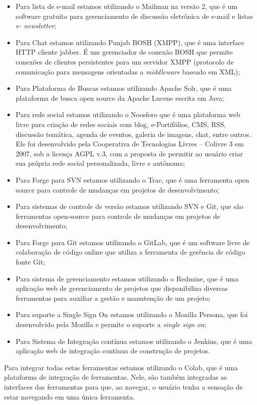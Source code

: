 \begin{itemize}

\item Para lista de e-mail estamos utilizando o Mailman na versão 2, que é um software gratuito para gerenciamento de discussão eletrônica de e-mail e listas {\it e- newsletter};

\item Para Chat estamos utilizando Punjab BOSH (XMPP), que é uma interface HTTP cliente jabber. É um gerenciador de conexão BOSH que permite conexões de clientes persistentes para um servidor XMPP (protocolo de comunicação para mensagens orientadas a {\it middleware} baseado em XML);

\item Para Plataforma de Buscas estamos utilizando Apache Solr, que é uma plataforma de busca open source da Apache Lucene escrita em Java;

\item Para rede social estamos utilizando o Noosfero que é uma plataforma web livre para criação de redes sociais com blog, e-Portifólios, CMS, RSS, discussão temática, agenda de eventos, galeria de imagens, chat, entre outros. Ele foi desenvolvido pela Cooperativa de Tecnologias Livres – Colivre 3 em 2007, sob a licença AGPL v.3, com a proposta de permitir ao usuário criar sua própria rede social personalizada, livre e autônoma;

\item Para Forge para SVN estamos utilizando o Trac, que é uma ferramenta open source para controle de mudanças em projetos de desenvolvimento;

\item Para sistemas de controle de versão estamos utilizando SVN e Git, que são ferramentas open-source para controle de mudanças em projetos de desenvolvimento;

\item Para Forge para Git estamos utilizando o GitLab, que é um software livre de colaboração de código online que utiliza a ferramenta de gerência de código fonte Git;

\item Para sistema de gerenciamento estamos utilizando o Redmine, que é uma aplicação web de gerenciamento de projetos que disponibiliza diversas ferramentas para auxiliar a gestão e manutenção de um projeto;

\item Para suporte a Single Sign On estamos utilizando o Mozilla Persona, que foi desenvolvido pela Mozilla e permite o suporte a {\it single sign on};

\item Para Sistema de Integração contínua estamos utilizando o Jenkins, que é uma aplicação web de integração contínua de construção de projetos.

\end{itemize}

Para integrar todas estas ferramentas estamos utilizando o Colab, que é uma plataforma de integração de ferramentas. Nele, são também integradas as interfaces das ferramentas para que, ao navegar, o usuário tenha a sensação de estar navegando em uma única ferramenta.

